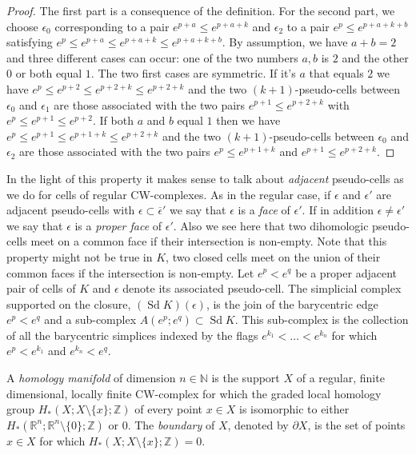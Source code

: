 \documentclass[AHL,Unicode,longabstracts,published]{cedram}
\newcommand{\R}{\mathbb{R}}
\newcommand{\Z}{\mathbb{Z}}
\newcommand{\N}{\mathbb{N}}
\DeclareMathOperator{\Sd}{Sd}
\begin{document}
\begin{proof}
The first part is a consequence of the definition. For the second part, we choose $\epsilon_0$ corresponding to a pair $e^{p+a}\leq e^{p+a+k}$ and $\epsilon_2$ to a pair $e^p\leq e^{p+a+k+b}$ satisfying $e^p\leq e^{p+a}\leq e^{p+a+k}\leq e^{p+a+k+b}$. By assumption, we have $a+b=2$ and three different cases can occur: one of the two numbers $a,b$ is $2$ and the other $0$ or both equal $1$. The two first cases are symmetric. If it's $a$ that equals $2$ we have $e^p\leq e^{p+2}\leq e^{p+2+k}\leq e^{p+2+k}$ and the two $(k+1)$-pseudo-cells between $\epsilon_0$ and $\epsilon_1$ are those associated with the two pairs $e^{p+1}\leq e^{p+2+k}$ with $e^p\leq e^{p+1}\leq e^{p+2}$. If both $a$ and $b$ equal $1$ then we have $e^p\leq e^{p+1}\leq e^{p+1+k}\leq e^{p+2+k}$ and the two $(k+1)$-pseudo-cells between $\epsilon_0$ and $\epsilon_2$ are those associated with the two pairs $e^p\leq e^{p+1+k}$ and $e^{p+1}\leq e^{p+2+k}$.
\end{proof}

In the light of this property it makes sense to talk about \emph{adjacent} pseudo-cells as we do for cells of regular CW-complexes. As in the regular case, if $\epsilon$ and $\epsilon'$ are adjacent pseudo-cells with $\epsilon\subset\overline{\epsilon}'$ we say that $\epsilon$ is a \emph{face} of $\epsilon'$. If in addition $\epsilon\neq\epsilon'$ we say that $\epsilon$ is a \emph{proper face} of $\epsilon'$. Also we see here that two dihomologic pseudo-cells meet on a common face if their intersection is non-empty. Note that this property might not be true in $K$, two closed cells meet on the union of their common faces if the intersection is non-empty. Let $e^p< e^q$ be a proper adjacent pair of cells of $K$ and $\epsilon$ denote its associated pseudo-cell. The simplicial complex supported on the closure, $(\Sd K)(\epsilon)$, is the join of the barycentric edge $e^p<e^q$ and a sub-complex $A(e^p;e^q)\subset\Sd K$. This sub-complex is the collection of all the barycentric simplices indexed by the flags $e^{k_1}<\dots<e^{k_{n}}$ for which $e^p<e^{k_1}$ and $e^{k_{n}}<e^q$.

\begin{defi}\label{definition:homo_man}
A \emph{homology manifold} of dimension $n\in\N$ is the support $X$ of a regular, finite dimensional, locally finite CW-complex for which the graded local homology group $H_*(X;X\setminus\{x\};\Z)$ of every point $x\in X$ is isomorphic to either $H_*(\R^n;\R^n\setminus \{0\};\Z)$ or $0$. The \emph{boundary} of $X$, denoted by $\partial X$, is the set of points $x\in X$ for which $H_*(X;X\setminus\{x\};\Z)=0$.
\end{defi}
\end{document}
